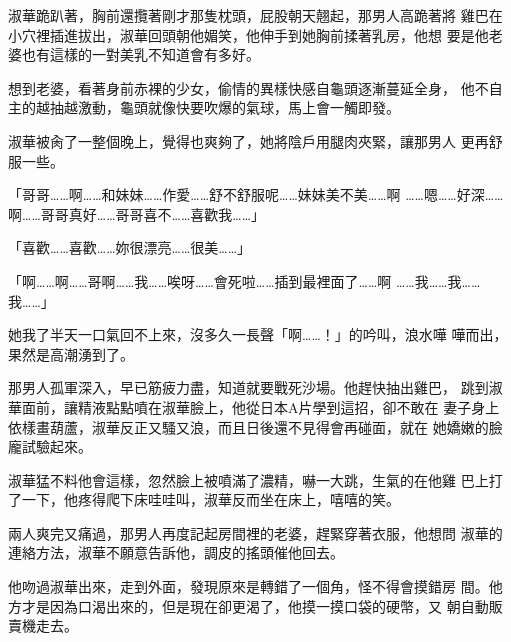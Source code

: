 淑華跪趴著，胸前還攬著剛才那隻枕頭，屁股朝天翹起，那男人高跪著將
雞巴在小穴裡插進拔出，淑華回頭朝他媚笑，他伸手到她胸前揉著乳房，他想
要是他老婆也有這樣的一對美乳不知道會有多好。

想到老婆，看著身前赤裸的少女，偷情的異樣快感自龜頭逐漸蔓延全身，
他不自主的越抽越激動，龜頭就像快要吹爆的氣球，馬上會一觸即發。

淑華被肏了一整個晚上，覺得也爽夠了，她將陰戶用腿肉夾緊，讓那男人
更再舒服一些。

「哥哥……啊……和妹妹……作愛……舒不舒服呢……妹妹美不美……啊
……嗯……好深……啊……哥哥真好……哥哥喜不……喜歡我……」

「喜歡……喜歡……妳很漂亮……很美……」

「啊……啊……哥啊……我……唉呀……會死啦……插到最裡面了……啊
……我……我……我……」

她我了半天一口氣回不上來，沒多久一長聲「啊……！」的吟叫，浪水嘩
嘩而出，果然是高潮湧到了。

那男人孤軍深入，早已筋疲力盡，知道就要戰死沙場。他趕快抽出雞巴，
跳到淑華面前，讓精液點點噴在淑華臉上，他從日本A片學到這招，卻不敢在
妻子身上依樣畫葫蘆，淑華反正又騷又浪，而且日後還不見得會再碰面，就在
她嬌嫩的臉龐試驗起來。

淑華猛不料他會這樣，忽然臉上被噴滿了濃精，嚇一大跳，生氣的在他雞
巴上打了一下，他疼得爬下床哇哇叫，淑華反而坐在床上，嘻嘻的笑。

兩人爽完又痛過，那男人再度記起房間裡的老婆，趕緊穿著衣服，他想問
淑華的連絡方法，淑華不願意告訴他，調皮的搖頭催他回去。

他吻過淑華出來，走到外面，發現原來是轉錯了一個角，怪不得會摸錯房
間。他方才是因為口渴出來的，但是現在卻更渴了，他摸一摸口袋的硬幣，又
朝自動販賣機走去。










